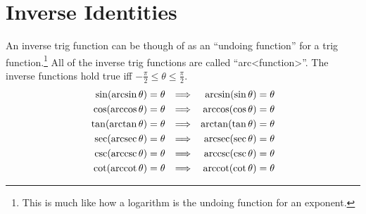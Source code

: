 \section{Inverse Identities}
\label{sec:TrigInverseIdentities}
An inverse trig function can be though of as an ``undoing function'' for a trig
function.\footnote{This is much like how a logarithm is the undoing function for
an exponent.} All of the inverse trig functions are called
``arc<function>''. The inverse functions hold true iff $-\frac{\pi}{2} \leq
\theta \leq \frac{\pi}{2}$.
\begin{align}
  \sin(\arcsin \theta) &= \theta&\Longrightarrow&&\arcsin(\sin \theta)=\theta \\
  \cos(\arccos \theta) &= \theta&\Longrightarrow&&\arccos(\cos \theta)=\theta \\
  \tan(\arctan \theta) &= \theta&\Longrightarrow&&\arctan(\tan \theta)=\theta \\
  \sec(\operatorname{arcsec} \theta) &= \theta&\Longrightarrow&&\operatorname{arcsec}(\sec \theta)=\theta \\
  \csc(\operatorname{arccsc} \theta) &= \theta&\Longrightarrow&&\operatorname{arccsc}(\csc \theta)=\theta \\
  \cot(\operatorname{arccot} \theta) &= \theta&\Longrightarrow&&\operatorname{arccot}(\cot \theta)=\theta
\end{align}
